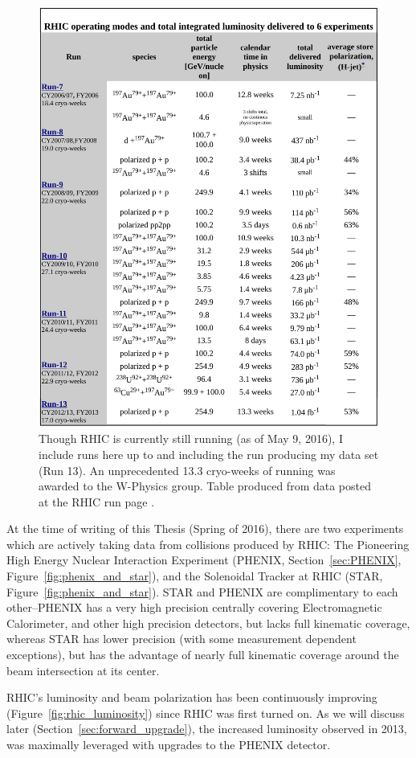 \begin{figure}[ht]
  \centering
  \includegraphics[width=0.8\linewidth]{./figures/rhic_late_run_summary.png}
  \caption{ 
    Though RHIC is currently still running (as of May 9, 2016), I include runs
    here up to and including the run producing my data set (Run 13). An
    unprecedented 13.3 cryo-weeks of running was awarded to the W-Physics
    group.  Table produced from data posted at the RHIC run
    page \cite{Fischer2016}.
  }
  \label{fig:rhic_late_run_summary}
\end{figure}

At the time of writing of this Thesis (Spring of 2016), there are two
experiments which are actively taking data from collisions produced by RHIC: The
Pioneering High Energy Nuclear Interaction Experiment (PHENIX,
Section~\ref{sec:PHENIX}, Figure~\ref{fig:phenix_and_star}), and the Solenoidal
Tracker at RHIC (STAR, Figure~\ref{fig:phenix_and_star}). STAR and PHENIX are
complimentary to each other--PHENIX has a very high precision centrally covering
Electromagnetic Calorimeter, and other high precision detectors, but lacks full
kinematic coverage, whereas STAR has lower precision (with some measurement
dependent exceptions), but has the advantage of nearly full kinematic coverage
around the beam intersection at its center.

RHIC's luminosity and beam polarization has been continuously improving
(Figure~\ref{fig:rhic_luminosity}) since RHIC was first turned on. As we will
discuss later (Section~\ref{sec:forward_upgrade}), the increased luminosity
observed in 2013, was maximally leveraged with upgrades to the PHENIX detector.


